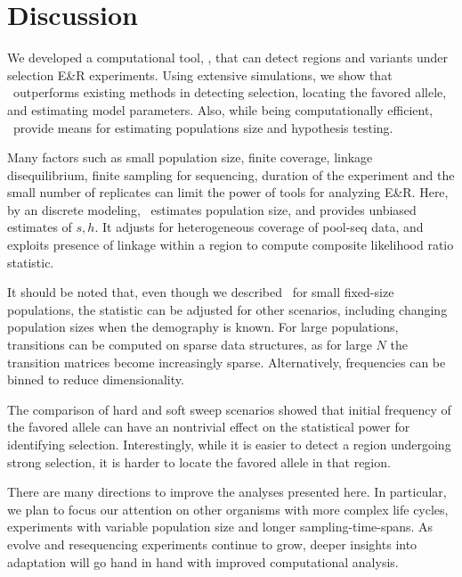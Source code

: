 \section{Discussion}
We developed a computational tool, \comale, that can detect regions
and variants under selection E\&R experiments. Using extensive simulations, 
we show that \comale\
outperforms existing methods in detecting selection, locating the
favored allele, and estimating model parameters.  Also, while
being computationally efficient, \comale\ provide means for estimating
populations size and hypothesis testing.

Many factors such as small population size, finite coverage, linkage
disequilibrium, finite sampling for sequencing, duration of the
experiment and the small number of replicates can limit the power of
tools for analyzing E\&R.  Here, by an discrete modeling, \comale\
estimates population size, and provides unbiased estimates of
$s,h$. It adjusts for heterogeneous coverage of pool-seq data, and
exploits presence of linkage within a region to compute composite
likelihood ratio statistic.


It should be noted that, even though we described \comale\ for small
fixed-size populations, the statistic can be adjusted for other
scenarios, including changing population sizes when the demography is
known. For large populations, transitions can be computed on sparse
data structures, as for large $N$ the transition matrices become
increasingly sparse. Alternatively, frequencies can be binned to
reduce dimensionality.


The comparison of hard and soft sweep scenarios showed that initial
frequency of the favored allele can have an nontrivial effect on the
statistical power for identifying selection. Interestingly, while it
is easier to detect a region undergoing strong selection, it is harder
to locate the favored allele in that region.


There are many directions to improve the analyses presented here.  In
particular, we plan to focus our attention on other organisms with
more complex life cycles, experiments with variable population size
and longer sampling-time-spans. As evolve and resequencing experiments
continue to grow, deeper insights into adaptation will go hand in hand
with improved computational analysis.




